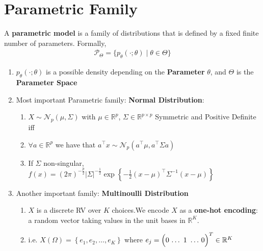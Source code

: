 \documentclass[a4paper,portrait,columns=2, hidelinks]{cheatsheet}
\begin{document}
\section{Parametric Family}
A \textbf{parametric model} is a family of distributions that is defined by a fixed finite number of parameters. Formally,
\begin{align*}
 \mathcal{P}_\Theta = \{ p_\theta (\cdot ; \theta) \mid \theta \in \Theta \}
\end{align*}
\begin{enumerate}
	\item  $p_\theta (\cdot ; \theta)$ is a possible density depending on the \textbf{Parameter} $ \theta $, and $\Theta $ is the \textbf{Parameter Space}
	\item Most important Parametric family: \textbf{Normal Distribution}:
	\begin{enumerate}
		\item \(X \sim \mathcal{N}_p(\mu, \Sigma)\) with \(\mu\in\mathbb{R}^p\), \(\Sigma \in \mathbb{R}^{p \times p}\) Symmetric and Positive Definite iff
		\item  \(\forall a \in \mathbb{R}^p\) we have that \(a^\intercal x \sim \mathcal{N}_p(a^\intercal\mu, a^\intercal\Sigma a)\)
		\item If \(\Sigma\) non-singular, \(f(x)={(2\pi)}^{-\frac{p}{2}}|\Sigma|^{-\frac{1}{2}}\exp{ \left\{-\frac{1}{2}(x-\mu)^\intercal\Sigma^{-1}(x-\mu) \right\} } \)
	\end{enumerate}
	\item Another important family: \textbf{Multinoulli Distribution}
	\begin{enumerate}
		\item $X$ is a discrete RV over $K$ choices.We encode $X$ as a \textbf{one-hot encoding}: a random vector taking values in the unit bases in $\mathbb{R}^{K}$.
		
		\item i.e. \(X(\Omega) = \left\{e_{1}, e_{2}, \ldots, e_{K}\right\}\) where \(e_{j} = \left(0\,\ldots\tikz[remember picture,baseline]{\node[anchor=base] (one-hot-1) {$1$};}\ldots\,0\right)^{T} \in \mathbb{R}^{K}\)
		
		\hfill
		

\end{enumerate}
\end{enumerate}
\end{document}

